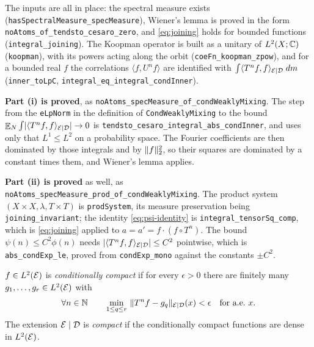 \begin{remark}
  The inputs are all in place: the spectral measure exists
  (\texttt{hasSpectralMeasure\_specMeasure}), Wiener's lemma is proved in the form
  \texttt{noAtoms\_of\_tendsto\_cesaro\_zero}, and \eqref{eq:joining} holds for bounded
  functions (\texttt{integral\_joining}).  The Koopman operator is built as a unitary of
  $L^2(X;\mathbb{C})$ (\texttt{koopman}), with its powers acting along the orbit
  (\texttt{coeFn\_koopman\_zpow}), and for a bounded real $f$ the correlations
  $\langle f, U^n f\rangle$ are identified with $\int \langle T^n f, f \rangle_{\mathcal{E} \mid \mathcal{D}} \;dm$
  (\texttt{inner\_toLpC}, \texttt{integral\_eq\_integral\_condInner}).

  \textbf{Part (i) is proved}, as \texttt{noAtoms\_specMeasure\_of\_condWeaklyMixing}.  The step
  from the \texttt{eLpNorm} in the definition of \texttt{CondWeaklyMixing} to the bound
  $\mathop{\mathbb{E}}_{N}\int \lvert \langle T^n f, f \rangle_{\mathcal{E} \mid \mathcal{D}} \rvert \to 0$ is
  \texttt{tendsto\_cesaro\_integral\_abs\_condInner}, and uses only that $L^1 \leq L^2$ on a
  probability space.  The Fourier coefficients are then dominated by those integrals and by
  $\lVert f \rVert_2 ^2$, so their squares are dominated by a constant times them, and Wiener's lemma
  applies.

  \textbf{Part (ii) is proved} as well, as
  \texttt{noAtoms\_specMeasure\_prod\_of\_condWeaklyMixing}.  The product system
  $(X\times X,\lambda,T\times T)$ is \texttt{prodSystem}, its measure preservation being
  \texttt{joining\_invariant}; the identity \eqref{eq:psi-identity} is
  \texttt{integral\_tensorSq\_comp}, which is \eqref{eq:joining} applied to
  $a = a' = f \cdot (f\circ T^n)$.  The bound $\psi(n) \leq C^2 \phi(n)$ needs
  $\lvert \langle T^nf, f \rangle_{\mathcal{E} \mid \mathcal{D}} \rvert \leq C ^2$ pointwise, which is \texttt{abs\_condExp\_le}, proved from
  \texttt{condExp\_mono} against the constants $\pm C^2$.
\end{remark}

\begin{definition}
  \label{def:compact-extension}
  \leanok
  $f \in L^2(\mathcal{E})$ is \emph{conditionally compact} if for every $\epsilon > 0$ there are
  finitely many $g_1,\dots,g_r \in L^2(\mathcal{E})$ with
  \[
    \forall n \in \mathbb{N} \qquad
    \min_{1 \leq q \leq r} \ \lVert T^n f - g_q \rVert_{\mathcal{E} \mid \mathcal{D}}(x) < \epsilon
    \quad \text{for a.e.\ } x .
  \]
  The extension $\mathcal{E} \mid \mathcal{D}$ is \emph{compact} if the conditionally compact functions are
  dense in $L^2(\mathcal{E})$.
\end{definition}

